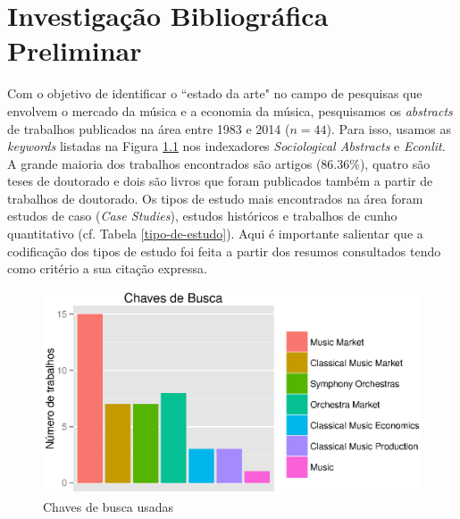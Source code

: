\documentclass[a4paper, 12pt, openright, oneside, german, french, english, brazil]{abntex2}
\begin{document}









	\chapter{Investigação Bibliográfica Preliminar}

	Com o objetivo de identificar o ``estado da arte"  no campo de pesquisas que envolvem o mercado da música e a economia da música, pesquisamos os \textit{abstracts} de trabalhos publicados na área entre 1983 e 2014 ($n=44$). Para isso, usamos as \textit{keywords} listadas na Figura \ref{chaves-busca} nos indexadores \textit{Sociological Abstracts} e \textit{Econlit}. A grande maioria dos trabalhos encontrados são artigos (86.36\%), quatro são teses de doutorado e dois são livros que foram publicados também a partir de trabalhos de doutorado. Os tipos de estudo mais encontrados na área foram estudos de caso (\textit{Case Studies}), estudos históricos e trabalhos de cunho quantitativo (cf. Tabela \ref{tipo-de-estudo}). Aqui é importante salientar que a codificação dos tipos de estudo foi feita a partir dos resumos consultados tendo como critério a sua citação expressa.

	\begin{figure}[!h]
		\centering
		\caption{Chaves de busca usadas}
		\label{chaves-busca}
		\includegraphics[scale=0.8]{chave.eps}
	\end{figure}
\end{document}
